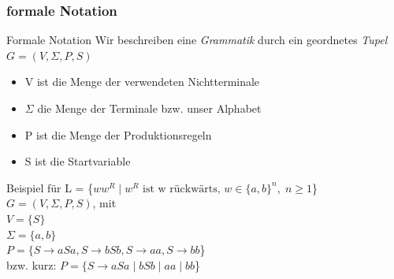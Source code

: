 \subsubsection{formale Notation}
\begin{frame}[fragile]{Formale Notation}
    Wir beschreiben eine \alert{\emph{Grammatik}} durch ein geordnetes \alert{\emph{Tupel}} $G = (V, \Sigma, P, S)$
    \begin{itemize}
        \item V ist die Menge der verwendeten Nichtterminale
        \item $\Sigma$ die Menge der Terminale bzw. unser Alphabet
        \item P ist die Menge der Produktionsregeln
        \item S ist die Startvariable
    \end{itemize}
    \begin{exampleblock}{Beispiel für  L = \{$ww^R\;|\;w^R\text{ ist w rückwärts, }w \in \{a, b\}^n, \; n \geq 1$\}}
        $G = (V,\Sigma,P,S)$, mit\\
        $V = \{S\}$\\
        $\Sigma = \{a,b\}$\\
        $P = \{S \rightarrow aSa, S \rightarrow bSb, S \rightarrow aa, S \rightarrow bb$\}\\
        \qquad bzw. kurz: $P = \{S \rightarrow aSa\;|\;bSb\;|\;aa\;|\;bb$\}
    \end{exampleblock}
\end{frame}

